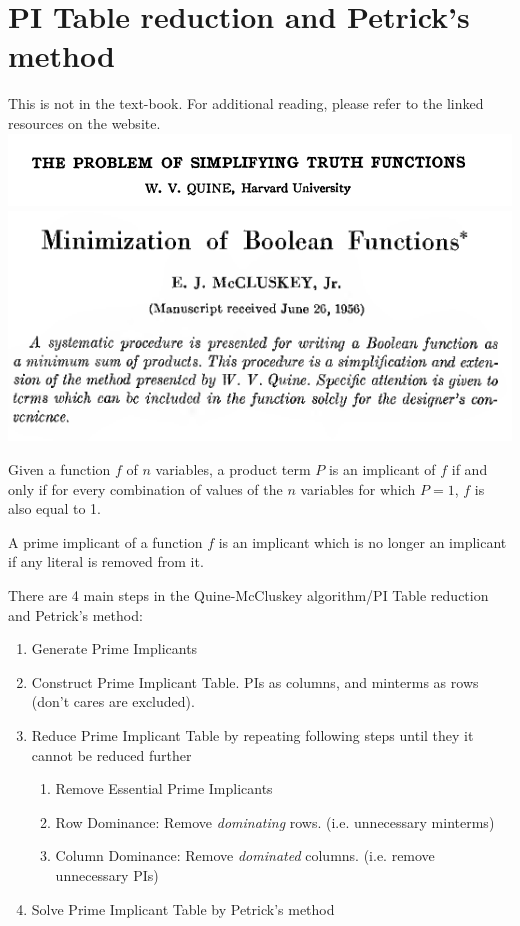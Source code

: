 \section{PI Table reduction and Petrick's method}
This is not in the text-book. For additional reading, please refer to the linked resources on the website.
\\
\includegraphics[width=0.7\linewidth]{1952-quine.png}\\
\includegraphics[width=0.7\linewidth]{1956-mccluskey.png}


\begin{definition}[Implicant]
  Given a function $f$ of $n$ variables, a product term $P$ is an implicant of $f$
  if and only if for every combination of values of the $n$ variables for which $P=1$, $f$ is
  also equal to 1.
\end{definition}

\begin{definition}
  A prime implicant of a function $f$ is an implicant which is no longer an
  implicant if any literal is removed from it.
\end{definition}

There are 4 main steps in the Quine-McCluskey algorithm/PI Table reduction and Petrick's method:

\begin{enumerate}
\item Generate Prime Implicants
\item Construct Prime Implicant Table. PIs as columns, and minterms as
  rows (don't cares are excluded).
\item Reduce Prime Implicant Table by repeating following steps until they
  it cannot be reduced further
\begin{enumerate}
  \item Remove Essential Prime Implicants
  \item Row Dominance: Remove \emph{dominating} rows. (i.e. unnecessary minterms)
  \item Column Dominance: Remove \emph{dominated} columns. (i.e. remove unnecessary PIs)
\end{enumerate}
\item Solve Prime Implicant Table by Petrick's method
\end{enumerate}


